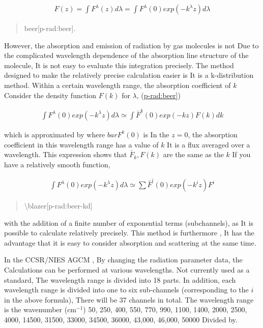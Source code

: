 \begin{eqnarray}
  F(z) = \int F^\lambda(z) d \lambda 
 = \int F^\lambda(0) exp (-k^\lambda z) d \lambda
\end{eqnarray}

\begin{quote}
\protect\hypertarget{p-rad:beer}{}{beer{[}p-rad:beer{]}}.
\end{quote}

However, the absorption and emission of radiation by gas molecules is
not Due to the complicated wavelength dependence of the absorption line
structure of the molecule, It is not easy to evaluate this integration
precisely. The method designed to make the relatively precise
calculation easier is It is a k-distribution method. Within a certain
wavelength range, the absorption coefficient of \(k\) Consider the
density function \(F(k)\) for \(\lambda\),
(\protect\hyperlink{p-rad:beer}{p-rad:beer{]}})

\begin{eqnarray}
 \int F^\lambda(0) exp (-k^\lambda z) d \lambda 
 \simeq \int \bar{F}^k(0) exp (-k z) F(k) dk
\end{eqnarray}

which is approximated by where \(bar{F}^k(0)\) is In the \(z=0\), the
absorption coefficient in this wavelength range has a value of \(k\) It
is a flux averaged over a wavelength. This expression shows that
\(\bar{F}_k, F(k)\) are the same as the \(k\) If you have a relatively
smooth function,

\begin{eqnarray}
 \int F^\lambda(0) exp (-k^\lambda z) d \lambda 
 \simeq \sum \bar{F}^i(0) exp (-k^i z) F^i
\end{eqnarray}

\begin{quote}
\protect\hypertarget{p-rad:beer-kd}{}{\textbackslash blazer{[}p-rad:beer-kd{]}}
\end{quote}

with the addition of a finite number of exponential terms (subchannels),
as It is possible to calculate relatively precisely. This method is
furthermore , It has the advantage that it is easy to consider
absorption and scattering at the same time.

In the CCSR/NIES AGCM , By changing the radiation parameter data, the
Calculations can be performed at various wavelengths. Not currently used
as a standard, The wavelength range is divided into 18 parts. In
addition, each wavelength range is divided into one to six sub-channels
(corresponding to the \(i\) in the above formula), There will be 37
channels in total. The wavelength range is the wavenumber (cm\(^{-1}\))
50, 250, 400, 550, 770, 990, 1100, 1400, 2000, 2500, 4000, 14500, 31500,
33000, 34500, 36000, 43,000, 46,000, 50000 Divided by.

